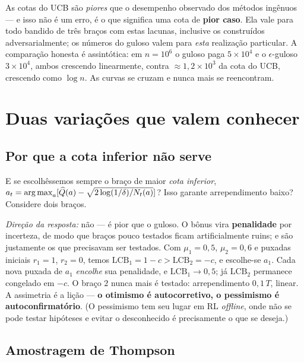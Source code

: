 \documentclass[11pt, a4paper]{article}
\newcommand{\Qhat}{\widehat{Q}}
\newcommand{\Nc}{N}
\newcommand{\LCB}{\mathrm{LCB}}
\begin{document}
\begin{alertabox}
As cotas do UCB são \emph{piores} que o desempenho observado dos métodos
ingênuos — e isso não é um erro, é o que significa uma cota de \textbf{pior
caso}. Ela vale para todo bandido de três braços com estas lacunas, inclusive
os construídos adversarialmente; os números do guloso valem para \emph{esta}
realização particular. A comparação honesta é assintótica: em $n = 10^6$ o
guloso paga $5\times10^4$ e o $\epsilon$-guloso $3\times10^4$, ambos
crescendo linearmente, contra $\approx 1{,}2\times10^3$ da cota do UCB,
crescendo como $\log n$. As curvas se cruzam e nunca mais se reencontram.
\end{alertabox}

\section{Duas variações que valem conhecer}

\subsection*{Por que a cota inferior não serve}

\begin{discbox}
E se escolhêssemos sempre o braço de maior \emph{cota inferior},
$a_t = \argmax_a[\Qhat(a) - \sqrt{2\log(1/\delta)/\Nc_t(a)}]$? Isso garante
arrependimento baixo? Considere dois braços.

\smallskip
\emph{Direção da resposta:} não — é pior que o guloso. O bônus vira
\textbf{penalidade} por incerteza, de modo que braços pouco testados ficam
artificialmente ruins; e são justamente os que precisavam ser testados. Com
$\mu_1 = 0{,}5$, $\mu_2 = 0{,}6$ e puxadas iniciais $r_1 = 1$, $r_2 = 0$,
temos $\LCB_1 = 1 - c > \LCB_2 = -c$, e escolhe-se $a_1$. Cada nova puxada de
$a_1$ \emph{encolhe} sua penalidade, e $\LCB_1 \to 0{,}5$; já $\LCB_2$
permanece congelado em $-c$. O braço $2$ nunca mais é testado:
arrependimento $0{,}1\,T$, linear. A assimetria é a lição --- \textbf{o
otimismo é autocorretivo, o pessimismo é autoconfirmatório}. (O pessimismo
tem seu lugar em RL \emph{offline}, onde não se pode testar hipóteses e
evitar o desconhecido é precisamente o que se deseja.)
\end{discbox}

\subsection*{Amostragem de Thompson}
\end{document}
